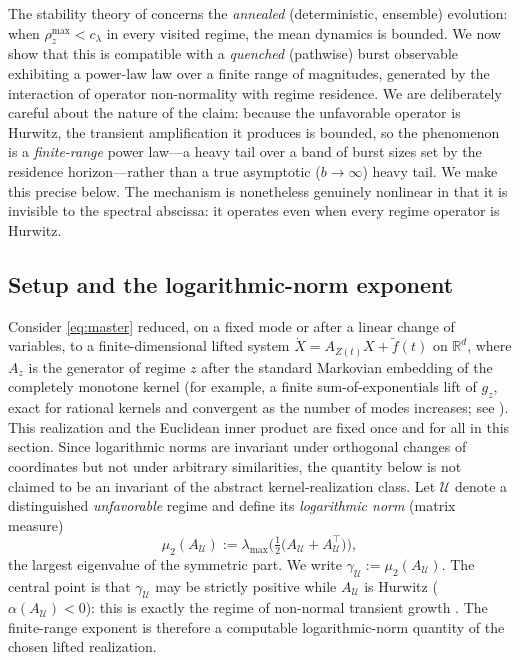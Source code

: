 \documentclass[11pt]{article}
\theoremstyle{plain}
\theoremstyle{definition}
\theoremstyle{remark}
\newcommand{\R}{\mathbb{R}}
\newcommand{\abscissa}{\alpha}
\newcommand{\lognorm}{\mu_2}
\newcommand{\branch}{\rho}
\newcommand{\HR}{\mathcal{U}}
\begin{document}
The stability theory of  concerns the \emph{annealed} (deterministic,
ensemble) evolution: when $\branch_z^{\max}<c_\lambda$ in every visited regime, the mean dynamics
is bounded. We now show that this is compatible with a \emph{quenched} (pathwise) burst
observable exhibiting a power-law law over a finite range of magnitudes, generated by the
interaction of operator non-normality with regime residence. We are deliberately careful about the
nature of the claim: because the unfavorable operator is Hurwitz, the transient amplification it
produces is bounded, so the phenomenon is a \emph{finite-range} power law---a heavy tail over a
band of burst sizes set by the residence horizon---rather than a true asymptotic ($b\to\infty$)
heavy tail. We make this precise below. The mechanism is nonetheless genuinely nonlinear in that
it is invisible to the spectral abscissa: it operates even when every regime operator is Hurwitz.

\subsection{Setup and the logarithmic-norm exponent}

Consider \eqref{eq:master} reduced, on a fixed mode or after a linear change of variables, to a
finite-dimensional lifted system $\dot X=A_{Z(t)}X+\tilde f(t)$ on $\R^d$, where $A_z$ is the
generator of regime $z$ after the standard Markovian embedding of the completely monotone kernel
(for example, a finite sum-of-exponentials lift of $g_z$, exact for rational kernels and
convergent as the number of modes increases; see \cite{bazhlekova2001fractional}). This realization
and the Euclidean inner product are fixed once and for all in this section. Since logarithmic norms
are invariant under orthogonal changes of coordinates but not under arbitrary similarities, the
quantity below is not claimed to be an invariant of the abstract kernel-realization class. Let
$\HR$ denote a distinguished \emph{unfavorable} regime and define its \emph{logarithmic norm}
(matrix measure)
\begin{equation}
\label{eq:logn_def}
\lognorm(A_\HR):=\lambda_{\max}\!\Big(\tfrac12\big(A_\HR+A_\HR^\top\big)\Big),
\end{equation}
the largest eigenvalue of the symmetric part. We write $\gamma_\HR:=\lognorm(A_\HR)$. The central
point is that $\gamma_\HR$ may be strictly positive while $A_\HR$ is Hurwitz
($\abscissa(A_\HR)<0$): this is exactly the regime of non-normal transient growth
\cite{trefethen2005spectra}. The finite-range exponent is therefore a computable
logarithmic-norm quantity of the chosen lifted realization.
\end{document}
